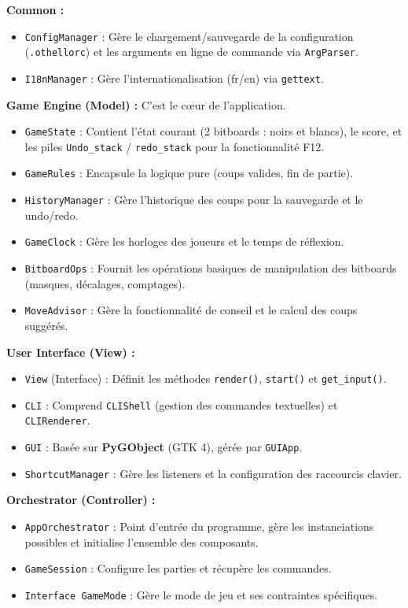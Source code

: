 \documentclass[a4paper]{article}
\begin{document}
\textbf{Common :}
\begin{itemize}
    \item \texttt{ConfigManager} : Gère le chargement/sauvegarde de la configuration (\texttt{.othellorc}) et les arguments en ligne de commande via \texttt{ArgParser}.
    \item \texttt{I18nManager} : Gère l'internationalisation (fr/en) via \texttt{gettext}.
\end{itemize}

\textbf{Game Engine (Model) :}
C'est le cœur de l'application.
\begin{itemize}
    \item \texttt{GameState} : Contient l'état courant (2 bitboards : noirs et blancs), le score, et les piles \texttt{Undo\_stack} / \texttt{redo\_stack} pour la fonctionnalité F12.
    \item \texttt{GameRules} : Encapsule la logique pure (coups valides, fin de partie).
    \item \texttt{HistoryManager} : Gère l'historique des coups pour la sauvegarde et le undo/redo.
    \item \texttt{GameClock} : Gère les horloges des joueurs et le temps de réflexion.
    \item \texttt{BitboardOps} : Fournit les opérations basiques de manipulation des bitboards (masques, décalages, comptages).
    \item \texttt{MoveAdvisor} : Gère la fonctionnalité de conseil et le calcul des coups suggérés.
\end{itemize}

\textbf{User Interface (View) :}
\begin{itemize}
    \item \texttt{View} (Interface) : Définit les méthodes \texttt{render()}, \texttt{start()} et \texttt{get\_input()}.
    \item \texttt{CLI} : Comprend \texttt{CLIShell} (gestion des commandes textuelles) et \texttt{CLIRenderer}.
    \item \texttt{GUI} : Basée sur \textbf{PyGObject} (GTK 4), gérée par \texttt{GUIApp}.
    \item \texttt{ShortcutManager} : Gère les listeners et la configuration des raccourcis clavier.
\end{itemize}

\textbf{Orchestrator (Controller) :}
\begin{itemize}
    \item \texttt{AppOrchestrator} : Point d'entrée du programme, gère les instanciations possibles et initialise l'ensemble des composants.
    \item \texttt{GameSession} : Configure les parties et récupère les commandes.
    
    \item \texttt{Interface GameMode} : Gère le mode de jeu et ses contraintes spécifiques.

\end{itemize}
\end{document}
